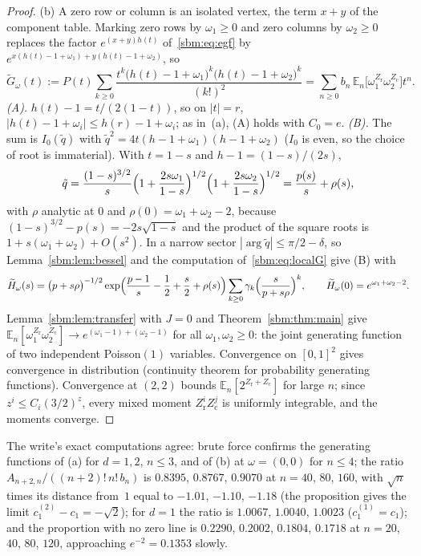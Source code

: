 \documentclass[11pt,letterpaper]{article}
\numberwithin{equation}{section}
\theoremstyle{remark}\newtheorem{remark}[theorem]{Remark}
\begin{document}
\begin{proof}
(b) A zero row or column is an isolated vertex, the term $x+y$ of the
component table. Marking zero rows by $\omega_1\ge0$ and zero columns by
$\omega_2\ge0$ replaces the factor $e^{(x+y)h(t)}$ of~\eqref{sbm:eq:egf} by
$e^{x(h(t)-1+\omega_1)+y(h(t)-1+\omega_2)}$, so
\[
 \widetilde G_\omega(t):=P(t)\sum_{k\ge0}
  \frac{t^k\bigl(h(t)-1+\omega_1\bigr)^k\bigl(h(t)-1+\omega_2\bigr)^k}{(k!)^2}
 =\sum_{n\ge0}b_n\,\mathbb E_n\bigl[\omega_1^{Z_{\mathrm r}}\omega_2^{Z_{\mathrm c}}\bigr]t^n .
\]
\emph{(A).} $h(t)-1=t/(2(1-t))$, so on $|t|=r$,
$|h(t)-1+\omega_i|\le h(r)-1+\omega_i$; as in~(a), (A) holds with $C_0=e$.
\emph{(B).} The sum is $I_0(\tilde q)$ with
$\tilde q^2=4t(h-1+\omega_1)(h-1+\omega_2)$ ($I_0$ is even, so the choice of
root is immaterial). With $t=1-s$ and $h-1=(1-s)/(2s)$,
\[
 \tilde q=\frac{(1-s)^{3/2}}s
 \Bigl(1+\frac{2s\omega_1}{1-s}\Bigr)^{1/2}\Bigl(1+\frac{2s\omega_2}{1-s}\Bigr)^{1/2}
 =\frac{p(s)}s+\rho(s),
\]
with $\rho$ analytic at $0$ and $\rho(0)=\omega_1+\omega_2-2$, because
$(1-s)^{3/2}-p(s)=-2s\sqrt{1-s}$ and the product of the square roots is
$1+s(\omega_1+\omega_2)+O(s^2)$. In a narrow sector
$|\arg\tilde q|\le\pi/2-\delta$, so Lemma~\ref{sbm:lem:bessel} and the
computation of~\eqref{sbm:eq:localG} give (B) with
\[
 \widetilde H_\omega(s)=\bigl(p+s\rho\bigr)^{-1/2}
 \exp\Bigl(\frac{p-1}s-\frac12+\frac s2+\rho(s)\Bigr)
 \sum_{k\ge0}\gamma_k\Bigl(\frac s{p+s\rho}\Bigr)^k,\qquad
 \widetilde H_\omega(0)=e^{\omega_1+\omega_2-2}.
\]
Lemma~\ref{sbm:lem:transfer} with $J=0$ and Theorem~\ref{sbm:thm:main} give
$\mathbb E_n[\omega_1^{Z_{\mathrm r}}\omega_2^{Z_{\mathrm c}}]\to
e^{(\omega_1-1)+(\omega_2-1)}$ for all $\omega_1,\omega_2\ge0$: the joint
generating function of two independent Poisson$(1)$ variables. Convergence on
$[0,1]^2$ gives convergence in distribution (continuity theorem for
probability generating functions). Convergence at $(2,2)$ bounds
$\mathbb E_n[2^{Z_{\mathrm r}+Z_{\mathrm c}}]$ for large $n$; since
$z^i\le C_i(3/2)^z$, every mixed moment $Z_{\mathrm r}^iZ_{\mathrm c}^j$ is
uniformly integrable, and the moments converge.
\end{proof}
The write's exact computations agree: brute force confirms the generating
functions of (a) for $d=1,2$, $n\le3$, and of (b) at $\omega=(0,0)$ for
$n\le4$; the ratio $A_{n+2,n}/((n+2)!\,n!\,b_n)$ is $0.8395$, $0.8767$,
$0.9070$ at $n=40$, $80$, $160$, with $\sqrt n$ times its distance from~$1$
equal to $-1.01$, $-1.10$, $-1.18$ (the proposition gives the limit
$c^{(2)}_1-c_1=-\sqrt2$); for $d=1$ the ratio is $1.0067$, $1.0040$, $1.0023$
($c^{(1)}_1=c_1$); and the proportion with no zero line is $0.2290$,
$0.2002$, $0.1804$, $0.1718$ at $n=20$, $40$, $80$, $120$, approaching
$e^{-2}=0.1353$ slowly.
\end{document}
